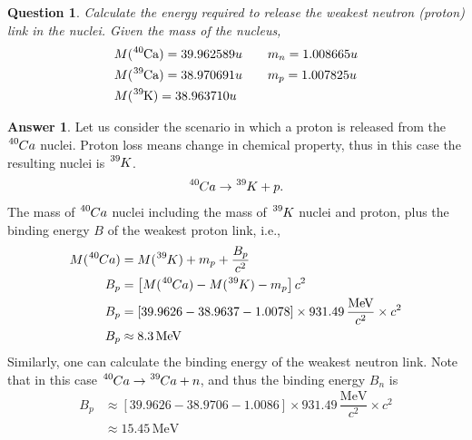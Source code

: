 \documentclass[12pt]{paper}
\numberwithin{equation}{section}
\newtheorem{question}{Question}
\theoremstyle{definition}
\newtheorem*{answer}{Answer}
\numberwithin{equation}{section}
\begin{document}
\begin{question}
    Calculate the energy required to release the weakest neutron (proton) link in the  nuclei. Given the mass of the nucleus,
    \begin{align}
        &M(\ce{^{40}Ca}) = 39.962589 u\qquad m_n = 1.008665 u\\
        &M(\ce{^{39}Ca}) = 38.970691 u\qquad m_p = 1.007825 u\\
        &M(\ce{^{39}K}) = 38.963710 u
    \end{align}
\end{question}
\begin{answer}
    Let us consider the scenario in which a proton is released from the $\ce{^40}Ca$ nuclei. Proton loss means change in chemical property, thus in this case the resulting nuclei is $\ce{^39}K$.
    \begin{align} 
        \ce{^40}Ca \rightarrow \ce{^39}K + p.
    \end{align}
    The mass of $\ce{^40}Ca$ nuclei including the mass of $\ce{^39}K$ nuclei and proton, plus the binding energy $B$ of the weakest proton link, i.e.,
    \begin{align} 
        M(\ce{^40}Ca) &= M(\ce{^39}K)+ m_p + \dfrac{B_p}{c^2} \\
        B_p &= \left[M(\ce{^40}Ca)-M(\ce{^39}K)-m_p\right]c^2 \\
        B_p & = \left[39.9626-38.9637-1.0078\right]\times 931.49\,\dfrac{\text{MeV}}{c^2}\times c^2 \\
        B_p & \approx 8.3\,\text{MeV}
    \end{align}
    Similarly, one can calculate the binding energy of the weakest neutron link. Note that in this case $\ce{^40}Ca \rightarrow \ce{^39}Ca + n$, and thus the binding energy $B_n$ is
    \begin{align}
        B_p &\approx \left[39.9626-38.9706-1.0086\right]\times 931.49\,\dfrac{\text{MeV}}{c^2}\times c^2 \\
        &\approx 15.45\,\text{MeV}
    \end{align}
\end{answer}
\end{document}
